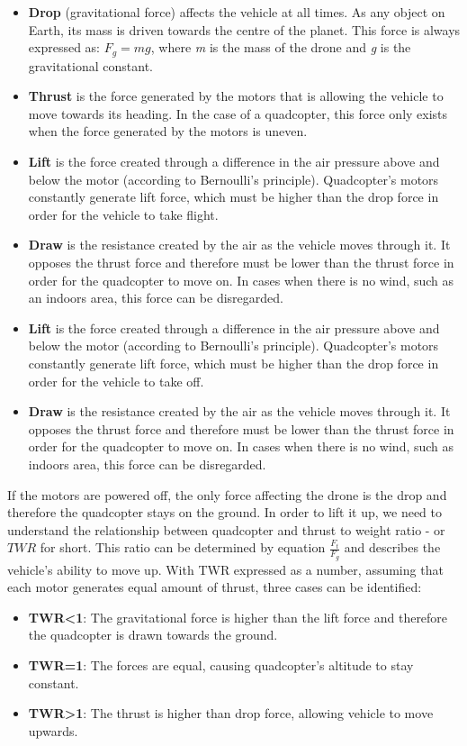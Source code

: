 \begin{itemize}
  \item \textbf{Drop} (gravitational force) affects the vehicle at all times. As any object on Earth, its mass is driven towards the centre of the planet. This force is always expressed as: $F_g = mg$, where \textit{m} is the mass of the drone and \textit{g} is the gravitational constant.
  \item \textbf{Thrust} is the force generated by the motors that is allowing the vehicle to move towards its heading. In the case of a quadcopter, this force only exists when the force generated by the motors is uneven.
  \item \textbf{Lift} is the force created through a difference in the air pressure above and below the motor (according to Bernoulli's principle). Quadcopter's motors constantly generate lift force, which must be higher than the drop force in order for the vehicle to take flight.
  \item \textbf{Draw} is the resistance created by the air as the vehicle moves through it. It opposes the thrust force and therefore must be lower than the thrust force in order for the quadcopter to move on. In cases when there is no wind, such as an indoors area, this force can be disregarded.
  \item \textbf{Lift} is the force created through a difference in the air pressure above and below the motor (according to Bernoulli's principle). Quadcopter's motors constantly generate lift force, which must be higher than the drop force in order for the vehicle to take off.
  \item \textbf{Draw} is the resistance created by the air as the vehicle moves through it. It opposes the thrust force and therefore must be lower than the thrust force in order for the quadcopter to move on. In cases when there is no wind, such as indoors area, this force can be disregarded.
\end{itemize} 

If the motors are powered off, the only force affecting the drone is the drop and therefore the quadcopter stays on the ground. In order to lift it up, we need to understand the relationship between quadcopter and thrust to weight ratio - or $TWR$ for short. This ratio can be determined by equation $\frac{F_t}{F_g}$ and describes the vehicle's ability to move up. With TWR expressed as a number, assuming that each motor generates equal amount of thrust, three cases can be identified:

\begin{itemize}
\item \textbf{TWR<1}: The gravitational force is higher than the lift force and therefore the quadcopter is drawn towards the ground.
\item \textbf{TWR=1}: The forces are equal, causing quadcopter's altitude to stay constant.
\item \textbf{TWR>1}: The thrust is higher than drop force, allowing vehicle to move upwards.
\end{itemize}

